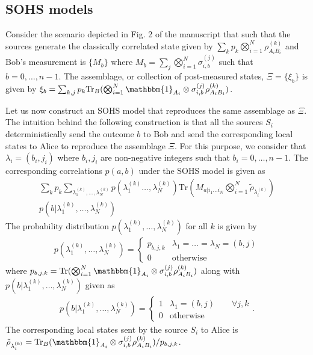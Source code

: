 \documentclass[pra,twocolumn,showpacs]{revtex4-2}
\newcommand{\Tr}[1]{\mathrm{Tr}#1}
\newcommand{\I}{\mathbbm{1}}
\newcommand{\p}{\Vec{p}}
\theoremstyle{plain}
\theoremstyle{definition}
\theoremstyle{remark}
\begin{document}
\subsection{SOHS models}
Consider the scenario depicted in Fig. 2 of the manuscript that such that the sources generate the classically correlated state given by $\sum_{k}p_k\bigotimes_{i=1}^N\rho^{(k)}_{A_iB_i}$ and Bob's measurement is $\{M_b\}$ where $M_b=\sum_{j}\bigotimes_{i=1}^N\sigma^{(j)}_{i,b}$ such that 
$b=0,\ldots,n-1$. The assemblage, or collection of post-measured states, $\Xi=\{\xi_b\}$ is given by $\xi_b=\sum_{k,j}p_k\Tr_{B}(\bigotimes_{i=1}^N\I_{A_i}\otimes\sigma^{(j)}_{i,b}\rho^{(k)}_{A_iB_i})$.


Let us now construct an SOHS model that reproduces the same assemblage as $\Xi$. The intuition behind the following construction is that all the sources $S_i$ deterministically send the outcome $b$ to Bob and send the corresponding local states to Alice to reproduce the assemblage $\Xi$. For this purpose, we consider that $\lambda_i=(b_i,j_i)$ where $b_i,j_i$ are non-negative integers such that $b_i=0,\ldots,n-1$. The corresponding correlations $p(a,b)$ under the SOHS model is given as 
\begin{eqnarray}
\sum_{k}p_{k}\sum_{\lambda_1^{(k)},\ldots,\lambda_N^{(k)}}p\left(\lambda_1^{(k)}\ldots,\lambda_N^{(k)}\right)\Tr\left(M_{a|i_1\ldots i_N}\bigotimes_{i=1}^N\tilde{\rho}_{\lambda_i^{(k)}}\right)\nonumber\\p\left(b|\lambda_1^{(k)},\ldots,\lambda_N^{(k)}\right)\qquad
\end{eqnarray}
The probability distribution $p(\lambda_1^{(k)},\ldots,\lambda_N^{(k)})$  for all $k$ is given by
\begin{eqnarray}
    p(\lambda_1^{(k)},\ldots,\lambda_N^{(k)})=\begin{cases}
        p_{b,j,k} & \lambda_1=\ldots=\lambda_N=(b,j)\\
        0  &\mathrm{otherwise}
    \end{cases}
\end{eqnarray}
where $p_{b,j,k}=\Tr(\bigotimes_{i=1}^N\I_{A_i}\otimes\sigma^{(j)}_{i,b}\rho^{(k)}_{A_iB_i})$ along with $p\left(b|\lambda_1^{(k)},\ldots,\lambda_N^{(k)}\right)$ given as
\begin{eqnarray}
p\left(b|\lambda_1^{(k)},\ldots,\lambda_N^{(k)}\right)=\begin{cases}
        1 & \lambda_1=(b,j) \qquad \forall j,k\\
        0  &\mathrm{otherwise}
    \end{cases}.
\end{eqnarray}
The corresponding local states sent by the source $S_i$ to Alice is $\tilde{\rho}_{\lambda_i^{(k)}}=\Tr_B(\I_{A_i}\otimes\sigma^{(j)}_{i,b}\rho^{(k)}_{A_iB_i})/p_{b,j,k}$.
\end{document}

